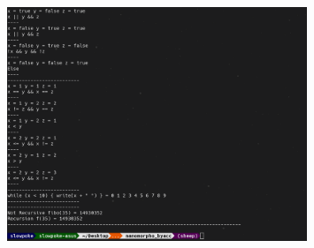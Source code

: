 \documentclass{homework}
\begin{document}
\begin{answer}
\begin{figure}[H]
  \end{figure}
  \begin{figure}[H]
    \centering
    \includegraphics[width=0.8\textwidth]{test_s2.png}
  \end{figure}
\end{answer}
\end{document}
